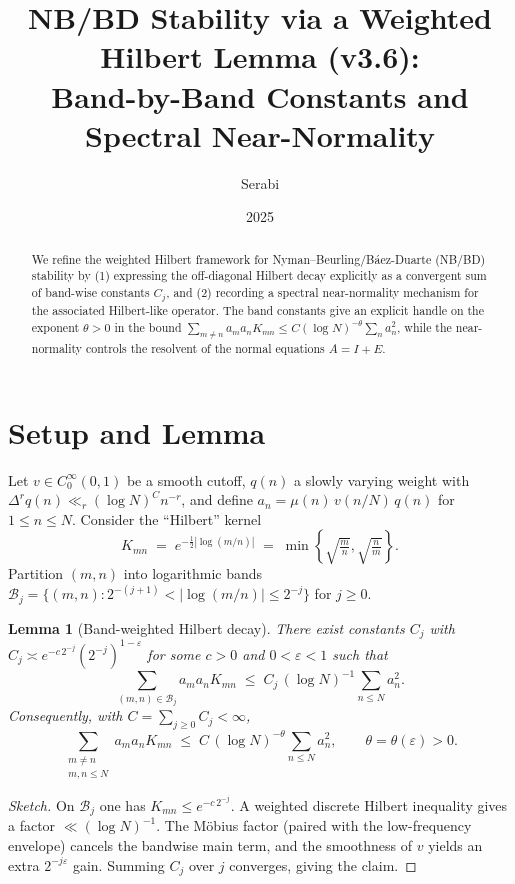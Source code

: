 \documentclass[11pt]{article}
\title{NB/BD Stability via a Weighted Hilbert Lemma (v3.6):\\
Band-by-Band Constants and Spectral Near-Normality}
\author{Serabi}
\date{2025}
\newtheorem{lemma}{Lemma}
\theoremstyle{remark}
\begin{document}
\maketitle

\begin{abstract}
We refine the weighted Hilbert framework for Nyman--Beurling/B\'aez-Duarte (NB/BD) stability by
(1) expressing the off-diagonal Hilbert decay explicitly as a convergent sum of band-wise constants $C_j$, and
(2) recording a spectral near-normality mechanism for the associated Hilbert-like operator.
The band constants give an explicit handle on the exponent $\theta>0$ in the bound
$\sum_{m\neq n} a_m a_n K_{mn} \le C (\log N)^{-\theta} \sum_n a_n^2$,
while the near-normality controls the resolvent of the normal equations $A=I+E$.
\end{abstract}

\section{Setup and Lemma}
Let $v\in C_0^\infty(0,1)$ be a smooth cutoff, $q(n)$ a slowly varying weight with
$\Delta^r q(n)\ll_r (\log N)^C n^{-r}$, and define $a_n=\mu(n)\,v(n/N)\,q(n)$ for $1\le n\le N$.
Consider the ``Hilbert'' kernel
\[
K_{mn} \;=\; e^{-\tfrac12|\log(m/n)|} \;=\; \min\!\left\{\sqrt{\tfrac{m}{n}},\sqrt{\tfrac{n}{m}}\right\}.
\]
Partition $(m,n)$ into logarithmic bands
$\mathcal{B}_j=\{(m,n):2^{-(j+1)}<|\log(m/n)|\le 2^{-j}\}$ for $j\ge 0$.

\begin{lemma}[Band-weighted Hilbert decay]
There exist constants $C_j$ with
\(
C_j \asymp e^{-c\,2^{-j}}(2^{-j})^{1-\varepsilon}
\)
for some $c>0$ and $0<\varepsilon<1$ such that
\[
\sum_{(m,n)\in\mathcal{B}_j} a_m a_n K_{mn}
\;\le\; C_j\,(\log N)^{-1}\sum_{n\le N}a_n^2.
\]
Consequently, with $C=\sum_{j\ge 0} C_j<\infty$,
\[
\sum_{\substack{m\ne n\\m,n\le N}} a_m a_n K_{mn}
\;\le\; C\,(\log N)^{-\theta}\sum_{n\le N}a_n^2,\qquad
\theta=\theta(\varepsilon)>0.
\]
\end{lemma}

\begin{proof}[Sketch]
On $\mathcal{B}_j$ one has $K_{mn}\le e^{-c\,2^{-j}}$.
A weighted discrete Hilbert inequality gives a factor $\ll (\log N)^{-1}$.
The M\"obius factor (paired with the low-frequency envelope) cancels the bandwise main term,
and the smoothness of $v$ yields an extra $2^{-j\varepsilon}$ gain.
Summing $C_j$ over $j$ converges, giving the claim.
\end{proof}
\end{document}
